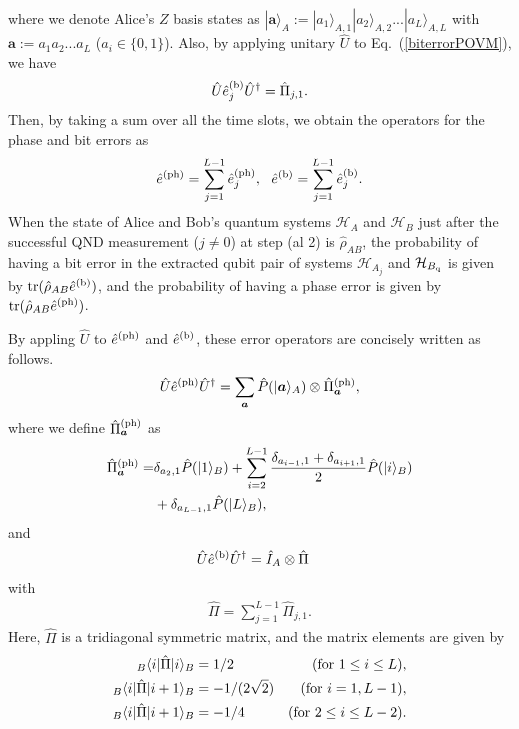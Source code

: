 \documentclass[prl,twocolumn,superscriptaddress,nofootinbib]{revtex4}
\def\U#1{{\rm #1}}
\newcommand{\bra}[1]{\langle #1 |}
\newcommand{\ket}[1]{| #1 \rangle}
\begin{document}
where we denote Alice's $Z$ basis states as $\ket{\bm{a}}_A:=\ket{a_1}_{A,1}\ket{a_2}_{A,2}...\ket{a_L}_{A,L}$
with $\bm{a}:=a_1a_2...a_L$ ($a_i\in\{0,1\}$). 
Also, by applying unitary $\hat{U}$ to Eq.~(\ref{biterrorPOVM}), we have~\cite{Kiyoshi2012dps}
\begin{align}
\hat{U}\hat{e}^{(\U{b})}_j\hat{U}^{\dagger}=\hat{\Pi}_{j,1}.
  \end{align}
Then, by taking a sum over all the time slots, we obtain the operators for the phase and bit errors as
\begin{align}
  \hat{e}^{(\U{ph})}=\sum^{L-1}_{j=1}\hat{e}^{(\U{ph})}_{j},~~\hat{e}^{(\U{b})}=\sum^{L-1}_{j=1}\hat{e}^{(\U{b})}_j.\label{bitphase}
  \end{align}
When the state of Alice and Bob's quantum systems $\mathcal{H}_A$ and $\mathcal{H}_B$ just after the 
successful QND measurement ($j\neq0$) at step (al 2) is
$\hat{\rho}_{AB}$, the probability of having a bit error in the extracted qubit pair of systems 
$\mathcal{H}_{A_j}$ and $\mathcal{H}_{B_{\U{q}}}$ is given by $\U{tr}(\hat{\rho}_{AB}\hat{e}^{(\U{b})})$, and the probability of
having a phase error is given by $\U{tr}(\hat{\rho}_{AB}\hat{e}^{(\U{ph})})$.

By appling $\hat{U}$ to $\hat{e}^{(\U{ph})}$ and  $\hat{e}^{(\U{b})}$, these error operators are concisely written as follows. 
\begin{align}
  \hat{U}\hat{e}^{(\U{ph})}\hat{U}^{\dagger}=\sum_{\bm{a}}\hat{P}(\ket{{\bm{a}}}_A)\otimes\hat{\Pi}^{\U{(ph)}}_{{\bm{a}}},
 \label{UephU}
  \end{align}
where we define $\hat{\Pi}^{\U{(ph)}}_{{\bm{a}}}$ as
\begin{align}
  \hat{\Pi}^{\U{(ph)}}_{{\bm{a}}}=&\delta_{a_2,1}\hat{P}(\ket{1}_B)
  +\sum^{L-1}_{i=2}\frac{\delta_{a_{i-1},1}+\delta_{a_{i+1},1}}{2}\hat{P}(\ket{i}_B)\notag\\
  &+\delta_{a_{L-1},1}\hat{P}(\ket{L}_B),
  \label{PiUph}
\end{align}
and
\begin{align}
  \hat{U}\hat{e}^{(\U{b})}\hat{U}^{\dagger}&=\hat{I}_A\otimes\hat{\Pi}
  \label{UeU}
\end{align}
with
\begin{align}
\hat{\Pi}=\sum^{L-1}_{j=1}\hat{\Pi}_{j,1}.\label{Pi}
\end{align}
Here, $\hat{\Pi}$ is a tridiagonal symmetric matrix, and the matrix elements are given by
\begin{align}
  {}_B\bra{i}\hat{\Pi}\ket{i}_B&=1/2&(\U{for}~1\leq i\leq L),\notag\\
  {}_B\bra{i}\hat{\Pi}\ket{i+1}_B&=-1/(2\sqrt{2})&(\U{for}~i=1, L-1),\notag\\
  {}_B\bra{i}\hat{\Pi}\ket{i+1}_B&=-1/4&(\U{for}~2\leq i\leq L-2).
  \end{align}
\end{document}
